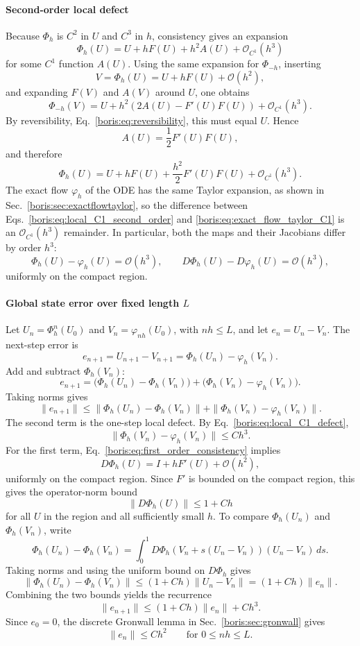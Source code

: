 \paragraph{Second-order local defect}
Because \(\Phi_h\) is \(C^2\) in \(U\) and \(C^3\) in \(h\), consistency gives
an expansion
\[
\Phi_h(U)=U+hF(U)+h^2 A(U)+\mathcal O_{C^1}(h^3)
\]
for some \(C^1\) function \(A(U)\).
Using the same expansion for \(\Phi_{-h}\), inserting
\[
V=\Phi_h(U)=U+hF(U)+\mathcal O(h^2),
\]
and expanding \(F(V)\) and \(A(V)\) around \(U\), one obtains
\[
\Phi_{-h}(V)
=
U+h^2\!\left(2A(U)-F'(U)F(U)\right)+\mathcal O_{C^1}(h^3).
\]
By reversibility, Eq.~\eqref{boris:eq:reversibility}, this must equal \(U\).
Hence
\[
A(U)=\frac12 F'(U)F(U),
\]
and therefore
\begin{equation}
\Phi_h(U)=U+hF(U)+\frac{h^2}{2}F'(U)F(U)+\mathcal O_{C^1}(h^3).
\label{boris:eq:local_C1_second_order}
\end{equation}
The exact flow \(\varphi_h\) of the ODE has the same Taylor expansion, as
shown in Sec.~\ref{boris:sec:exactflowtaylor}, so
the difference between Eqs.~\eqref{boris:eq:local_C1_second_order} and
\eqref{boris:eq:exact_flow_taylor_C1} is an \(\mathcal O_{C^1}(h^3)\) remainder.
In particular, both the maps and their Jacobians differ by order \(h^3\):
\begin{equation}
\Phi_h(U)-\varphi_h(U)=\mathcal O(h^3),
\qquad
D\Phi_h(U)-D\varphi_h(U)=\mathcal O(h^3),
\label{boris:eq:local_C1_defect}
\end{equation}
uniformly on the compact region.

\paragraph{Global state error over fixed length \(L\)}
Let \(U_n=\Phi_h^n(U_0)\) and \(V_n=\varphi_{nh}(U_0)\), with \(nh\le L\), and
let \(e_n=U_n-V_n\).
The next-step error is
\[
e_{n+1}
=
U_{n+1}-V_{n+1}
=
\Phi_h(U_n)-\varphi_h(V_n).
\]
Add and subtract \(\Phi_h(V_n)\):
\[
e_{n+1}
=
\bigl(\Phi_h(U_n)-\Phi_h(V_n)\bigr)
+
\bigl(\Phi_h(V_n)-\varphi_h(V_n)\bigr).
\]
Taking norms gives
\[
\|e_{n+1}\|
\le
\|\Phi_h(U_n)-\Phi_h(V_n)\|
+
\|\Phi_h(V_n)-\varphi_h(V_n)\|.
\]
The second term is the one-step local defect. By
Eq.~\eqref{boris:eq:local_C1_defect},
\[
\|\Phi_h(V_n)-\varphi_h(V_n)\|\le Ch^3.
\]
For the first term, Eq.~\eqref{boris:eq:first_order_consistency} implies
\[
D\Phi_h(U)=I+hF'(U)+\mathcal O(h^2),
\]
uniformly on the compact region.
Since \(F'\) is bounded on the compact region, this gives the operator-norm
bound
\[
\|D\Phi_h(U)\|\le 1+Ch
\]
for all \(U\) in the region and all sufficiently small \(h\).
To compare \(\Phi_h(U_n)\) and \(\Phi_h(V_n)\), write
\[
\Phi_h(U_n)-\Phi_h(V_n)
=
\int_0^1
D\Phi_h\!\left(V_n+s(U_n-V_n)\right)(U_n-V_n)\,ds.
\]
Taking norms and using the uniform bound on \(D\Phi_h\) gives
\[
\|\Phi_h(U_n)-\Phi_h(V_n)\|
\le
(1+Ch)\|U_n-V_n\|
=
(1+Ch)\|e_n\|.
\]
Combining the two bounds yields the recurrence
\[
\|e_{n+1}\|\le (1+Ch)\|e_n\| + Ch^3.
\]
Since \(e_0=0\), the discrete Gronwall lemma in Sec.~\ref{boris:sec:gronwall}
gives
\begin{equation}
\|e_n\|\le C h^2
\qquad \text{for } 0\le nh\le L.
\label{boris:eq:global_state_error}
\end{equation}

